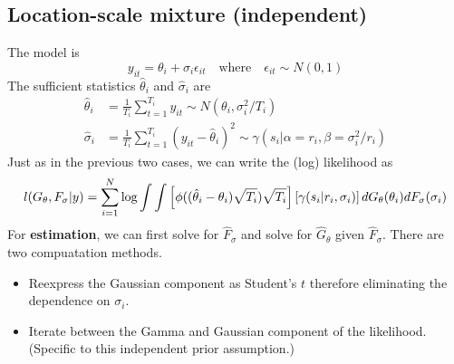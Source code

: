 \subsection{Location-scale mixture (independent)}
The model is \begin{equation*}
    y_{it}=\theta_i+\sigma_i\epsilon_{it} \quad \text{where} \quad \epsilon_{it}\sim N(0,1)
\end{equation*}
The sufficient statistics $\hat{\theta}_i$ and $\hat{\sigma}_i$ are \begin{align*}
    \hat{\theta}_i & =\frac{1}{T_i}\sum_{t=1}^{T_i}y_{it} \sim N(\theta_i, \sigma_i^2/T_i)                                       \\
    \hat{\sigma}_i & =\frac{1}{T_i}\sum_{t=1}^{T_i}(y_{it}-\hat{\theta}_i)^2\sim \gamma(s_i | \alpha= r_i, \beta=\sigma_i^2/r_i)\end{align*}
Just as in the previous two cases, we can write the (log) likelihood as \begin{equation*}
    l(G_{\theta},F_{\sigma}|y)=\sum_{i=1}^N\log\int \int \left[\phi((\hat{\theta}_i-\theta_i)\sqrt{T_i})\sqrt{T_i}\right] \left[\gamma(s_i|r_i,\sigma_i)\right] dG_{\theta}(\theta_i) dF_{\sigma}(\sigma_i)
\end{equation*}
For \textbf{estimation}, we can first solve for $\hat{F}_{\sigma}$ and solve for $\hat{G}_{\theta}$ given $\hat{F}_{\sigma}$. There are two compuatation methods.
\begin{itemize}
    \item Reexpress the Gaussian component as Student's $t$ therefore eliminating the
          dependence on $\sigma_i$.
    \item Iterate between the Gamma and Gaussian component of the likelihood. (Specific
          to this independent prior assumption.)
\end{itemize}
